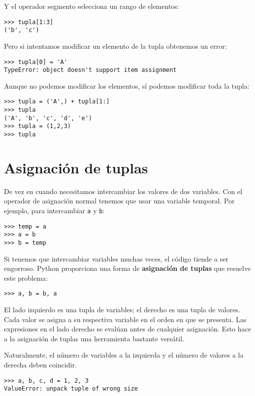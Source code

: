 Y el operador segmento selecciona un rango de elementos:
\begin{verbatim}
>>> tupla[1:3]
('b', 'c')
\end{verbatim}

Pero si intentamos modificar un elemento de la tupla obtenemos un
error:

\begin{verbatim}
>>> tupla[0] = 'A'
TypeError: object doesn't support item assignment
\end{verbatim}

Aunque no podemos modificar los elementos, sí podemos modificar toda
la tupla:
\begin{verbatim}
>>> tupla = ('A',) + tupla[1:]
>>> tupla
('A', 'b', 'c', 'd', 'e')
>>> tupla = (1,2,3)
>>> tupla
\end{verbatim}

\section{Asignación de tuplas}

\label{tuple assignment}  

De vez en cuando necesitamos intercambiar los valores de dos variables.
Con el operador de asignación normal tenemos que usar una variable
temporal. Por ejemplo, para intercambiar \texttt{a} y \texttt{b}:
\begin{verbatim}
>>> temp = a
>>> a = b
>>> b = temp
\end{verbatim}

Si tenemos que intercambiar variables muchas veces, el código tiende
a ser engorroso. Python proporciona una forma de \textbf{asignación
de tuplas} que resuelve este problema:
\begin{verbatim}
>>> a, b = b, a
\end{verbatim}

El lado izquierdo es una tupla de variables; el derecho es una tupla
de valores. Cada valor se asigna a su respectiva variable en el orden
en que se presenta. Las expresiones en el lado derecho se evalúan
antes de cualquier asignación. Esto hace a la asignación de tuplas
una herramienta bastante versátil.

Naturalmente, el número de variables a la izquierda y el número de
valores a la derecha deben coincidir.
\begin{verbatim}
>>> a, b, c, d = 1, 2, 3
ValueError: unpack tuple of wrong size
\end{verbatim}

